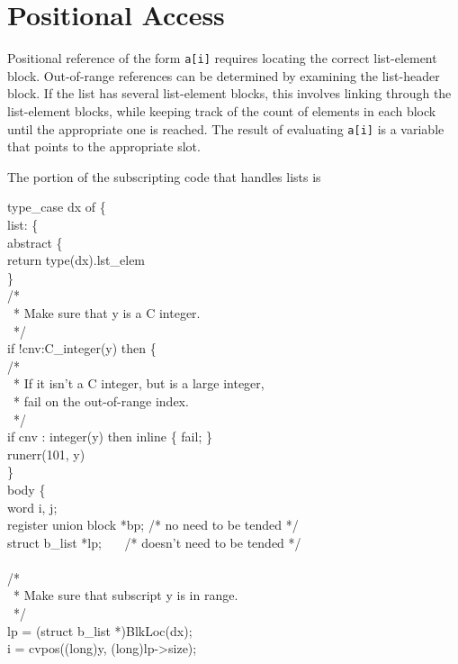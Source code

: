 \section{Positional Access}

Positional reference of the form \texttt{a[i]} requires locating the
correct list-element block. Out-of-range references can be determined
by examining the list-header block. If the list has several
list-element blocks, this involves linking through the list-element
blocks, while keeping track of the count of elements in each block
until the appropriate one is reached. The result of evaluating
\texttt{a[i]} is a variable that points to the appropriate slot.

The portion of the subscripting code that handles lists is

\begin{iconcode}
\>type\_case dx of \{\\
\>\>list: \{\\
\>\>\>abstract \{\\
\>\>\>\>return type(dx).lst\_elem\\
\>\>\>\>\}\\
\>\>\>/*\\
\>\>\>\ * Make sure that y is a C integer.\\
\>\>\>\ */\\
\>\>\>if !cnv:C\_integer(y) then \{\\
\>\>/*\\
\>\>\ * If it isn't a C integer, but is a large integer,\\
\>\>\ * fail on the out-of-range index.\\
\>\>\ */\\
\>\>if cnv : integer(y) then inline \{ fail; \}\\
\>\>runerr(101, y)\\
\>\>\}\\
\>\>\>body \{\\
\>\>\>\>word i, j;\\
\>\>\>\>register union block *bp; /* no need to be tended */\\
\>\>\>\>struct b\_list *lp; \ \ \ /* doesn't need to be tended */\\
\\
\>\>/*\\
\>\>\ * Make sure that subscript y is in range.\\
\>\>\ */\\
\>\>\>\>lp = (struct b\_list *)BlkLoc(dx);\\
\>\>\>\>i = cvpos((long)y, (long)lp->size);\\

\end{iconcode}
